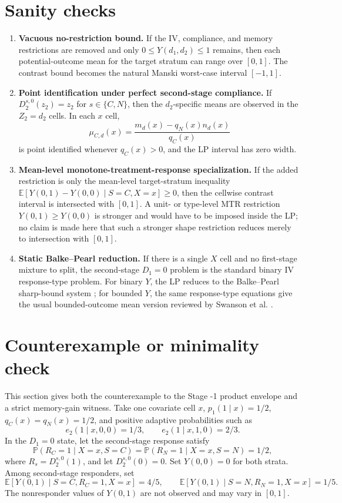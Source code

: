 \documentclass[11pt]{article}
\newcommand{\E}{\mathbb{E}}
\renewcommand{\Pr}{\mathbb{P}}
\theoremstyle{definition}
\theoremstyle{plain}
\theoremstyle{remark}
\begin{document}
\section{Sanity checks}
\begin{enumerate}[leftmargin=*]
\item \textbf{Vacuous no-restriction bound.}  If the IV, compliance, and memory restrictions are removed and only \(0\le Y(d_1,d_2)\le1\) remains, then each potential-outcome mean for the target stratum can range over \([0,1]\).  The contrast bound becomes the natural Manski worst-case interval \([-1,1]\).

\item \textbf{Point identification under perfect second-stage compliance.}  If \(D_2^{s,0}(z_2)=z_2\) for \(s\in\{C,N\}\), then the \(d_2\)-specific means are observed in the \(Z_2=d_2\) cells.  In each \(x\) cell,
\[
\mu_{C,d}(x)=
\frac{m_d(x)-q_N(x)n_d(x)}{q_C(x)}
\]
is point identified whenever \(q_C(x)>0\), and the LP interval has zero width.

\item \textbf{Mean-level monotone-treatment-response specialization.}  If the added restriction is only the mean-level target-stratum inequality \(\E[Y(0,1)-Y(0,0)\mid S=C,X=x]\ge0\), then the cellwise contrast interval is intersected with \([0,1]\).  A unit- or type-level MTR restriction \(Y(0,1)\ge Y(0,0)\) is stronger and would have to be imposed inside the LP; no claim is made here that such a stronger shape restriction reduces merely to intersection with \([0,1]\).

\item \textbf{Static Balke--Pearl reduction.}  If there is a single \(X\) cell and no first-stage mixture to split, the second-stage \(D_1=0\) problem is the standard binary IV response-type problem.  For binary \(Y\), the LP reduces to the Balke--Pearl sharp-bound system \cite{BalkePearl1997}; for bounded \(Y\), the same response-type equations give the usual bounded-outcome mean version reviewed by Swanson et al. \cite{SwansonHernanMillerRobinsRichardson2018}.
\end{enumerate}

\section{Counterexample or minimality check}\label{sec:counterexample}
This section gives both the counterexample to the Stage -1 product envelope and a strict memory-gain witness.  Take one covariate cell \(x\), \(p_1(1\mid x)=1/2\), \(q_C(x)=q_N(x)=1/2\), and positive adaptive probabilities such as
\[
e_2(1\mid x,0,0)=1/3,\qquad e_2(1\mid x,1,0)=2/3.
\]
In the \(D_1=0\) state, let the second-stage response satisfy
\[
\Pr(R_C=1\mid X=x,S=C)=\Pr(R_N=1\mid X=x,S=N)=1/2,
\]
where \(R_s=D_2^{s,0}(1)\), and let \(D_2^{s,0}(0)=0\).  Set \(Y(0,0)=0\) for both strata.  Among second-stage responders, set
\[
\E[Y(0,1)\mid S=C,R_C=1,X=x]=4/5,\qquad
\E[Y(0,1)\mid S=N,R_N=1,X=x]=1/5.
\]
The nonresponder values of \(Y(0,1)\) are not observed and may vary in \([0,1]\).
\end{document}
